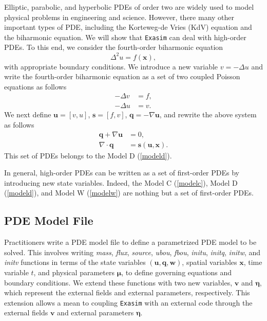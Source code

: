 \documentclass[11pt]{article}
\begin{document}
Elliptic, parabolic, and hyperbolic PDEs of order two are widely used to model physical problems in engineering and science. However, there many other important types of PDE, including the Korteweg-de Vries (KdV) equation and the biharmonic equation.  We will show that \texttt{Exasim} can deal with high-order PDEs. To this end, we consider the fourth-order biharmonic equation
\begin{equation}
\Delta^2 u = f(\bm x) ,
\end{equation}
with appropriate boundary conditions. We introduce a new variable $v = - \Delta u$ and write the fourth-order biharmonic equation as a set of two coupled Poisson equations as follows 
\begin{subequations}
\begin{alignat}{2}
-\Delta v & = f,\\
-\Delta u & = v .
\end{alignat}
\end{subequations}
We next define $\bm u = [v, u]$, $\bm s = [f, v]$, $\bm q = - \nabla \bm u$, and rewrite the above system as follows
\begin{subequations}
\begin{alignat}{2}
\bm q + \nabla \bm u & = 0,\\
\nabla \cdot \bm q & = \bm s(\bm u, \bm x) .
\end{alignat}
\end{subequations}
This set of PDEs belongs to the Model D (\ref{modeld}).

In general, high-order PDEs can be written as a set of first-order PDEs by introducing new state variables. Indeed, the Model C (\ref{modelc}), Model D (\ref{modeld}), and Model W (\ref{modelw}) are nothing but a set of first-order PDEs. 

\subsection{PDE Model File}

Practitioners write a PDE model file to define a parametrized PDE model to be solved.  This involves writing  {\em mass}, {\em flux},  {\em source}, {\em ubou},  {\em fbou},  {\em initu}, {\em initq}, {\em initw}, and {\em initv} functions in terms of the state variables $(\bm u, \bm q, \bm w)$, spatial variables $\bm x$, time variable $t$, and physical parameters $\bm \mu$, to define governing equations and boundary conditions. We extend these functions with two new variables, $\bm v$ and $\bm \eta$, which represent the external fields and external parameters, respectively. This extension allows a mean to coupling \texttt{Exasim} with an external code through the external fields $\bm v$ and external parameters $\bm \eta$. 
\end{document}
